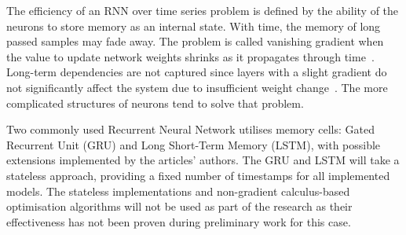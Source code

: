 The efficiency of an RNN over time series problem is defined by the ability of the neurons to store memory as an internal state.
With time, the memory of long passed samples may fade away.
The problem is called vanishing gradient when the value to update network weights shrinks as it propagates through time~\cite{rasifaghihi_predictive_2020}.
Long-term dependencies are not captured since layers with a slight gradient do not significantly affect the system due to insufficient weight change~\cite{rasifaghihi_predictive_2020,hochreiter_vanishing_1998}.
The more complicated structures of neurons tend to solve that problem.

%
Two commonly used Recurrent Neural Network utilises memory cells: Gated Recurrent Unit (GRU) and Long Short-Term Memory (LSTM), with possible extensions implemented by the articles' authors.
The GRU and LSTM will take a stateless approach, providing a fixed number of timestamps for all implemented models.
The stateless implementations and non-gradient calculus-based optimisation algorithms will not be used as part of the research as their effectiveness has not been proven during preliminary work for this case.


